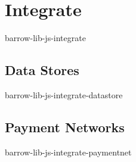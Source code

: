 \section{Integrate}
barrow-lib-js-integrate

\subsection{Data Stores}
barrow-lib-js-integrate-datastore

\subsection{Payment Networks}
barrow-lib-js-integrate-paymentnet
